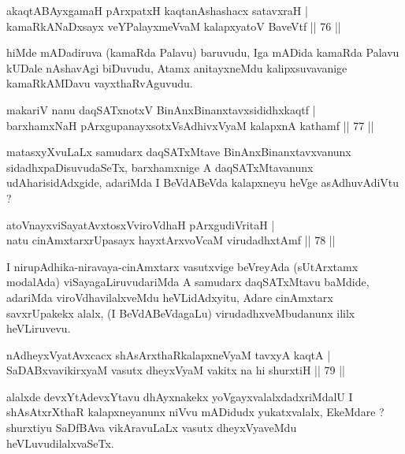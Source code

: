 \begin{shl}
akaqtABAyxgamaH pArxpatxH kaqtanAshashacx satavxraH  | \\
kamaRkANaDxsayx veYPalayxmeVvaM kalapxyatoV BaveVtf \hfill||  76 ||  
\end{shl}

\begin{artha}
hiMde mADadiruva (kamaRda Palavu) baruvudu, Iga mADida kamaRda Palavu kUDale nAshavAgi biDuvudu, Atamx anitayxneMdu kalipxsuvavanige kamaRkAMDavu vayxthaRvAguvudu.
\end{artha}


\begin{shl}
makariV nanu daqSATxnotxV BinAnxBinanxtavxsididhxkaqtf  | \\
barxhamxNaH pArxgupanayxsotxV\s sAdhivxVyaM kalapxnA kathamf \hfill||  77 ||  
\end{shl}

\begin{artha}
matasxyXvuLaLx samudarx daqSATxMtave BinAnxBinanxtavxvanunx sidadhxpaDisuvudaSeTx, barxhamxnige A daqSATxMtavanunx udAharisidAdxgide, adariMda I BeVdABeVda kalapxneyu heVge asAdhuvAdiVtu ?
\end{artha}


\begin{shl}
atoV\s nayxviSayatAvxtosxV\s viroVdhaH pArxgudiVritaH  | \\
natu cinAmxtarxrUpasayx hayxtArxvoVcaM virudadhxtAmf \hfill||  78 ||  
\end{shl}

\begin{artha}
I nirupAdhika-niravaya-cinAmxtarx vasutxvige beVreyAda (sUtArxtamx modalAda) viSayagaLiruvudariMda A samudarx daqSATxMtavu baMdide, adariMda viroVdhavilalxveMdu heVLidAdxyitu, Adare cinAmxtarx savxrUpakekx alalx, (I BeVdABeVdagaLu) virudadhxveMbudanunx ililx heVLiruvevu.
\end{artha}

\begin{shl}
nAdheyxVyatAvxcacx shAsArxthaRkalapxneVyaM tavxyA kaqtA  | \\
SaDABxvavikirxyaM vasutx dheyxVyaM vakitx na hi shurxtiH \hfill||  79 ||  
\end{shl}

\begin{artha}
alalxde devxYtAdevxYtavu dhAyxnakekx yoVgayxvalalxdadxriMdalU I shAsAtxrXthaR kalapxneyanunx niVvu mADidudx yukatxvalalx, EkeMdare ? shurxtiyu SaDfBAva vikAravuLaLx vasutx dheyxVyaveMdu heVLuvudilalxvaSeTx.
\end{artha}

